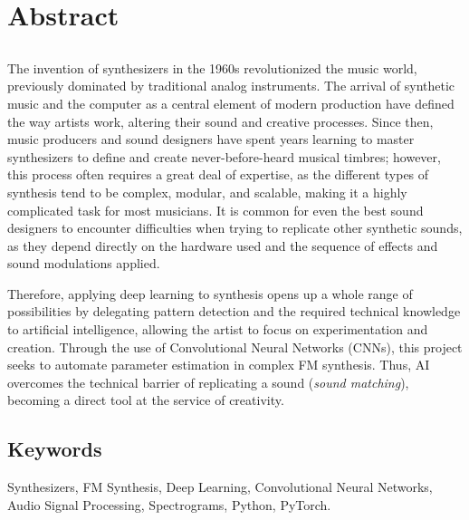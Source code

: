\chapter*{Abstract}

\section*{\tituloPortadaVal}

The invention of synthesizers in the 1960s revolutionized the music world, previously dominated by traditional analog instruments. The arrival of synthetic music and the computer as a central element of modern production have defined the way artists work, altering their sound and creative processes. Since then, music producers and sound designers have spent years learning to master synthesizers to define and create never-before-heard musical timbres; however, this process often requires a great deal of expertise, as the different types of synthesis tend to be complex, modular, and scalable, making it a highly complicated task for most musicians. It is common for even the best sound designers to encounter difficulties when trying to replicate other synthetic sounds, as they depend directly on the hardware used and the sequence of effects and sound modulations applied.

Therefore, applying deep learning to synthesis opens up a whole range of possibilities by delegating pattern detection and the required technical knowledge to artificial intelligence, allowing the artist to focus on experimentation and creation. Through the use of Convolutional Neural Networks (CNNs), this project seeks to automate parameter estimation in complex FM synthesis. Thus, AI overcomes the technical barrier of replicating a sound (\textit{sound matching}), becoming a direct tool at the service of creativity.

\vspace{1em} 

\section*{Keywords}
   
\noindent Synthesizers, FM Synthesis, Deep Learning, Convolutional Neural Networks, Audio Signal Processing, Spectrograms, Python, PyTorch.